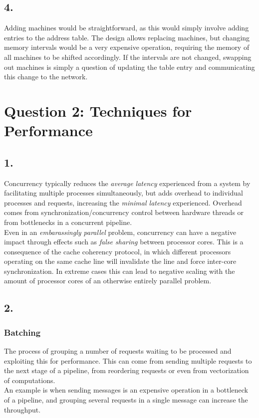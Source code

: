 \documentclass[12pt]{article}
\begin{document}
\subsection*{4.} %

Adding machines would be straightforward, as this would simply involve adding entries to the address table. The design allows replacing machines, but changing memory intervals would be a very expensive operation, requiring the memory of all machines to be shifted accordingly. If the intervals are not changed, swapping out machines is simply a question of updating the table entry and communicating this change to the network.

\section*{Question 2: Techniques for Performance}

\subsection*{1.} %

Concurrency typically reduces the \emph{average latency} experienced from a system by facilitating multiple processes simultaneously, but adds overhead to individual processes and requests, increasing the \emph{minimal latency} experienced. Overhead comes from synchronization/concurrency control between hardware threads or from bottlenecks in a concurrent pipeline. \\
Even in an \emph{embarassingly parallel} problem, concurrency can have a negative impact through effects such as \emph{false sharing} between processor cores. This is a consequence of the cache coherency protocol, in which different processors operating on the same cache line will invalidate the line and force inter-core synchronization. In extreme cases this can lead to negative scaling with the amount of processor cores of an otherwise entirely parallel problem.

\subsection*{2.} %

\subsubsection*{Batching}
The process of grouping a number of requests waiting to be processed and exploiting this for performance. This can come from sending multiple requests to the next stage of a pipeline, from reordering requests or even from vectorization of computations. \\
An example is when sending messages is an expensive operation in a bottleneck of a pipeline, and grouping several requests in a single message can increase the throughput.
\end{document}
